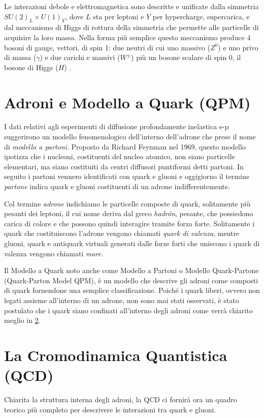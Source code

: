     Le interazioni debole e elettromagnetica sono descritte e unificate dalla simmetria $SU(2)_L \times U(1)_Y$, dove $L$ sta per leptoni e $Y$ per hypercharge, supercarica, e dal meccanismo di Higgs di rottura della simmetria che permette alle particelle di acquisire la loro massa. Nella forma più semplice questo meccanismo produce 4 bosoni di gauge, vettori, di spin 1: due neutri di cui uno massivo ($Z^0$) e uno privo di massa ($\gamma$) e due carichi e massivi ($W^\pm$) più un bosone scalare di spin 0, il bosone di Higgs ($H$) \cite{Vitale_1995}.

    \newpage

\section{Adroni e Modello a Quark (QPM)}
\label{sec:QPM}
    I dati relativi agli esperimenti di diffusione profondamente inelastica e-p suggerirono un modello fenomenologico dell'interno dell'adrone che prese il nome di \textit{modello a partoni}. Proposto da Richard Feynman nel 1969, questo modello ipotizza che i nucleoni, costituenti del nucleo atomico, non siano particelle elementari, ma siano costituiti da centri diffusori puntiformi detti partoni. In seguito i partoni vennero identificati con quark e gluoni e oggigiorno il termine \textit{partone} indica quark e gluoni costituenti di un adrone indifferentemente.
    
    Col termine \textit{adrone} indichiamo le particelle composte di quark, solitamente più pesanti dei leptoni, il cui nome deriva dal greco \textit{hadrón}, pesante, che possiedono carica di colore e che possono quindi interagire tramite forza forte. Solitamente i quark che costituiscono l'adrone vengono chiamati \textit{quark di valenza}, mentre gluoni, quark e antiquark virtuali generati dalle forze forti che uniscono i quark di valenza vengono chiamati \textit{mare}.

    Il Modello a Quark noto anche come Modello a Partoni o Modello Quark-Partone (Quark-Parton Model QPM), è un modello che descrive gli adroni come composti di quark fornendone una semplice classificazione. Poiché i quark liberi, ovvero non legati assieme all'interno di un adrone, non sono mai stati osservati, è stato postulato che i quark siano confinati all'interno degli adroni come verrà chiarito meglio in \ref{sec:QCD}.

\section{La Cromodinamica Quantistica (QCD)}
\label{sec:QCD}
    Chiarita la struttura interna degli adroni, la QCD ci fornirà ora un quadro teorico più completo per descrivere le interazioni tra quark e gluoni.

